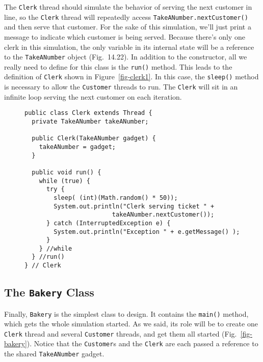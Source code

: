 \noindent The {\tt Clerk} thread should simulate the behavior of serving the
next customer in line, so the {\tt Clerk} thread will repeatedly
access {\tt TakeANumber.\-nextCustomer()} and then serve that customer.
For the sake of this simulation, we'll just print a message to
indicate which customer is being served.  Because there's only one
clerk in this simulation, the only variable in its internal state will
be a reference to the {\tt TakeANumber} object
(Fig.~14.22).  In addition to the constructor, all we
really need to define for this class is the {\tt run()} method.  This
leads to the definition of {\tt Clerk} shown in
Figure~\ref{fig-clerk1}.  In this case, the {\tt sleep()} method is
necessary to allow the {\tt Customer} threads to run.  The {\tt Clerk}
will sit in an infinite loop serving the next customer on each
iteration.

\begin{figure}[h]
\jjjprogstart
\begin{jjjlisting}[27pc]
\begin{lstlisting}
public class Clerk extends Thread {
  private TakeANumber takeANumber;

  public Clerk(TakeANumber gadget) {
    takeANumber = gadget;
  }

  public void run() {
    while (true) {
      try {
        sleep( (int)(Math.random() * 50));
        System.out.println("Clerk serving ticket " + 
                        takeANumber.nextCustomer());
      } catch (InterruptedException e) {
        System.out.println("Exception " + e.getMessage() );
      }
    } //while
  } //run()
} // Clerk
\end{lstlisting}
\end{jjjlisting}
\end{figure}


\subsection{The {\tt Bakery} Class}
\noindent Finally, {\tt Bakery} is the simplest class to design.   It contains
the {\tt main()} method, which gets the whole simulation started.   As
we said, its role will be to create one {\tt Clerk} thread and
several {\tt Customer} threads, and get them all started
(Fig.~\ref{fig-bakery}). Notice that the {\tt Customer}s and the
{\tt Clerk} are each passed a reference to the shared
{\tt TakeANumber} gadget.


